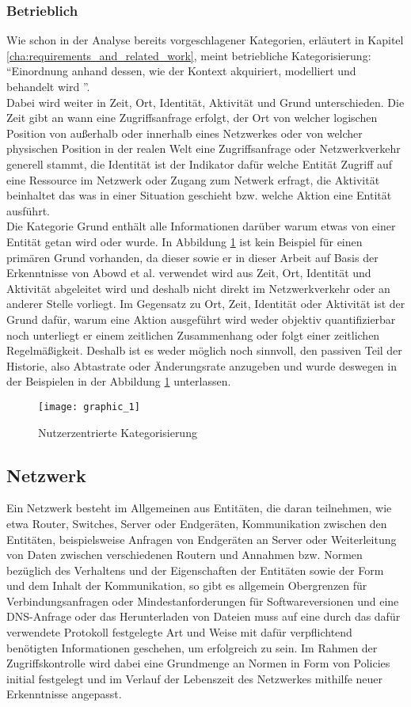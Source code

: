 \subsubsection{Betrieblich}
Wie schon in der Analyse bereits vorgeschlagener Kategorien, erläutert in Kapitel \ref{cha:requirements_and_related_work}, meint betriebliche Kategorisierung: ``Einordnung anhand dessen, wie der Kontext akquiriert, modelliert und behandelt wird ''\cite{van2005context}.\\
Dabei wird weiter in Zeit, Ort, Identität, Aktivität und Grund unterschieden. Die Zeit gibt an wann eine Zugriffsanfrage erfolgt, der Ort von welcher logischen Position von außerhalb oder innerhalb eines Netzwerkes oder von welcher physischen Position in der realen Welt eine Zugriffsanfrage oder Netzwerkverkehr generell stammt, die Identität ist der Indikator dafür welche Entität Zugriff auf eine Ressource im Netzwerk oder Zugang zum Netwerk erfragt, die Aktivität beinhaltet das was in einer Situation geschieht bzw. welche Aktion eine Entität ausführt.\\
Die Kategorie Grund enthält alle Informationen darüber warum etwas von einer Entität getan wird oder wurde. In Abbildung \ref{Tax_1} ist kein Beispiel für einen primären Grund vorhanden, da dieser sowie er in dieser Arbeit auf Basis der Erkenntnisse von Abowd et al. \cite{abowd_towards_1999} verwendet wird aus Zeit, Ort, Identität und Aktivität abgeleitet wird und deshalb nicht direkt im Netzwerkverkehr oder an anderer Stelle vorliegt. Im Gegensatz zu Ort, Zeit, Identität oder Aktivität ist der Grund dafür, warum eine Aktion ausgeführt wird weder objektiv quantifizierbar noch unterliegt er einem zeitlichen Zusammenhang oder folgt einer zeitlichen Regelmäßigkeit. Deshalb ist es weder möglich noch sinnvoll, den passiven Teil der Historie, also Abtastrate oder Änderungsrate anzugeben und wurde deswegen in der Beispielen in der Abbildung \ref{Tax_1} unterlassen.
\begin{figure}[H]
\label{Tax_1}
\centering
\texttt{[image: graphic\_1]}
\caption{Nutzerzentrierte Kategorisierung}
\end{figure}
\subsection{Netzwerk}
Ein Netzwerk besteht im Allgemeinen aus Entitäten, die daran teilnehmen, wie etwa Router, Switches, Server oder Endgeräten, Kommunikation zwischen den Entitäten, beispielsweise Anfragen von Endgeräten an Server oder Weiterleitung von Daten zwischen verschiedenen Routern und Annahmen bzw. Normen bezüglich des Verhaltens und der Eigenschaften der Entitäten sowie der Form und dem Inhalt der Kommunikation, so gibt es allgemein Obergrenzen für Verbindungsanfragen oder Mindestanforderungen für Softwareversionen und eine DNS-Anfrage oder das Herunterladen von Dateien muss auf eine durch das dafür verwendete Protokoll festgelegte Art und Weise mit dafür verpflichtend benötigten Informationen geschehen, um erfolgreich zu sein.
Im Rahmen der Zugriffskontrolle wird dabei eine Grundmenge an Normen in Form von Policies initial festgelegt und im Verlauf der Lebenszeit des Netzwerkes mithilfe neuer Erkenntnisse angepasst.
